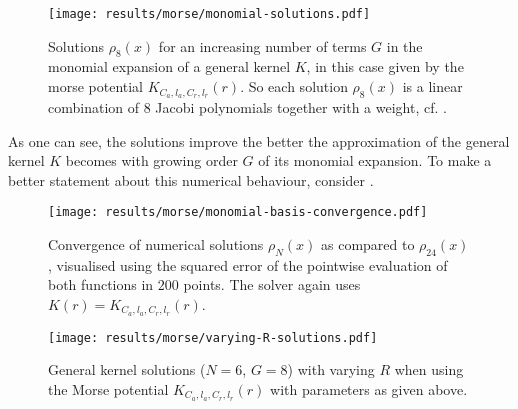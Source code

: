 \begin{figure}[H]
  \centering
  \texttt{[image: results/morse/monomial-solutions.pdf]}
  \caption[]{Solutions $\rho_8(x)$ for an increasing number of terms $G$ in the monomial expansion of a general kernel $K$, in this case given by the morse potential $K_{C_a, l_a, C_r, l_r}(r)$. So each solution $\rho_8(x)$ is a linear combination of $8$ Jacobi polynomials together with a weight, cf. .}
  \label{fig:monomial-solutions}
\end{figure}

As one can see, the solutions improve the better the approximation of the general kernel $K$ becomes with growing order $G$ of its monomial expansion.
To make a better statement about this numerical behaviour, consider .

\begin{figure}[H]
  \centering
  \texttt{[image: results/morse/monomial-basis-convergence.pdf]}
  \caption[Step-by-step convergence of solutions when increasing the degree of the monomial]{
    Convergence of numerical solutions $\rho_N(x)$ as compared to $\rho_{24}(x)$, visualised using the squared error of the pointwise evaluation of both functions in $200$ points.
    The solver again uses $K(r) = K_{C_a, l_a, C_r, l_r}(r)$.
  }
  \label{fig:monomial-basis-convergence}
\end{figure}

\begin{figure}[H]
  \centering
  \texttt{[image: results/morse/varying-R-solutions.pdf]}
  \caption[Solutions with varying $R$]{General kernel solutions ($N = 6$, $G = 8$) with varying $R$ when using the Morse potential $K_{C_a, l_a, C_r, l_r}(r)$ with parameters as given above.}
  \label{fig:varying-R-solutions}
\end{figure}

